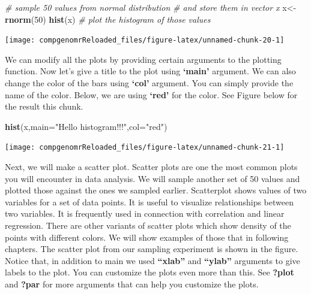 \documentclass[12pt,]{krantz}
\newenvironment{Shaded}{\begin{snugshade}}{\end{snugshade}}
\newcommand{\CommentTok}[1]{\textcolor[rgb]{0.56,0.35,0.01}{\textit{#1}}}
\newcommand{\DataTypeTok}[1]{\textcolor[rgb]{0.13,0.29,0.53}{#1}}
\newcommand{\DecValTok}[1]{\textcolor[rgb]{0.00,0.00,0.81}{#1}}
\newcommand{\KeywordTok}[1]{\textcolor[rgb]{0.13,0.29,0.53}{\textbf{#1}}}
\newcommand{\NormalTok}[1]{#1}
\newcommand{\StringTok}[1]{\textcolor[rgb]{0.31,0.60,0.02}{#1}}
\theoremstyle{definition}
\theoremstyle{definition}
\theoremstyle{definition}
\theoremstyle{remark}
\begin{document}
\begin{Shaded}
\begin{Highlighting}[]
\CommentTok{# sample 50 values from normal distribution}
\CommentTok{# and store them in vector x}
\NormalTok{x<-}\KeywordTok{rnorm}\NormalTok{(}\DecValTok{50}\NormalTok{)}
\KeywordTok{hist}\NormalTok{(x) }\CommentTok{# plot the histogram of those values}
\end{Highlighting}
\end{Shaded}

\begin{center}\texttt{[image: compgenomrReloaded\_files/figure-latex/unnamed-chunk-20-1]} \end{center}

We can modify all the plots by providing certain arguments to the
plotting function. Now let's give a title to the plot using
\textbf{`main'} argument. We can also change the color of the bars using
\textbf{`col'} argument. You can simply provide the name of the color.
Below, we are using \textbf{`red'} for the color. See Figure below for
the result this chunk.

\begin{Shaded}
\begin{Highlighting}[]
\KeywordTok{hist}\NormalTok{(x,}\DataTypeTok{main=}\StringTok{"Hello histogram!!!"}\NormalTok{,}\DataTypeTok{col=}\StringTok{"red"}\NormalTok{)}
\end{Highlighting}
\end{Shaded}

\begin{center}\texttt{[image: compgenomrReloaded\_files/figure-latex/unnamed-chunk-21-1]} \end{center}

Next, we will make a scatter plot. Scatter plots are one the most common
plots you will encounter in data analysis. We will sample another set of
50 values and plotted those against the ones we sampled earlier.
Scatterplot shows values of two variables for a set of data points. It
is useful to visualize relationships between two variables. It is
frequently used in connection with correlation and linear regression.
There are other variants of scatter plots which show density of the
points with different colors. We will show examples of those that in
following chapters. The scatter plot from our sampling experiment is
shown in the figure. Notice that, in addition to main we used
\textbf{``xlab''} and \textbf{``ylab''} arguments to give labels to the
plot. You can customize the plots even more than this. See
\textbf{?plot} and \textbf{?par} for more arguments that can help you
customize the plots.
\end{document}
